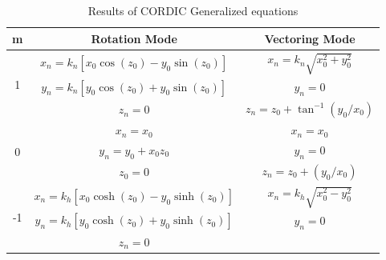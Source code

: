\begin{table}[h]
\centering
\caption{Results of CORDIC Generalized equations}
\label{table:cordic_gen}
\begin{tabular}{ccc}
\hline
\multicolumn{1}{c}{m}                  & Rotation Mode                                 & Vectoring Mode                           \\ \hline
\multicolumn{1}{c}{\multirow{3}{*}{1}} & $x_n = k_n[x_0 \cos(z_0) - y_0 \sin(z_0)]$   &  $x_n = k_n\sqrt{x_0^2 + y_0^2}$\\
\multicolumn{1}{c}{}                   & $y_n = k_n[y_0 \cos(z_0) + y_0 \sin(z_0)]$   & $y_n = 0$                                \\
\multicolumn{1}{c}{}                   & $z_n = 0$                                     & $z_n = z_0+\tan^{-1}(y_0/x_0)$    \\ \hline
\multirow{3}{*}{0}                     & $x_{n} = x_0$                                 & $x_n = x_0$                              \\
                                       & $y_n = y_0 + x_0 z_0$                         & $y_n = 0$                                \\
                                       & $z_0 = 0$                                     & $z_n = z_0 + (y_0 /x_0 )$                \\ \hline
\multirow{3}{*}{-1}                    & $x_n = k_h[x_0 \cosh(z_0) - y_0 \sinh(z_0)]$  & $x_n = k_h\sqrt{x_0^2 - y_0^2}$         \\
                                       & $y_n = k_h[y_0 \cosh(z_0) + y_0 \sinh(z_0)]$  & $y_n = 0$                                \\
                                       & $z_n = 0$                                     &       \\ \hline
\end{tabular}
\end{table}

